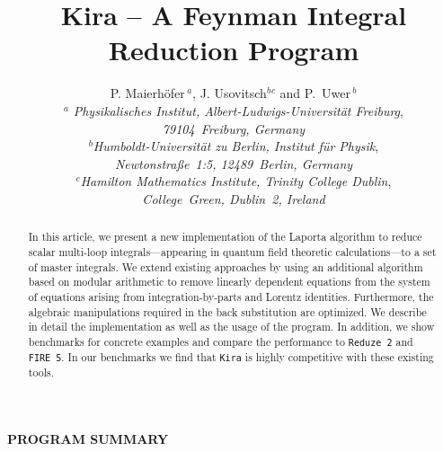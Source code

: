 \documentclass[a4paper,12pt]{scrartcl}
\title{\Large Kira -- A Feynman Integral Reduction Program}
\author{\large  P. Maierh\"ofer$\,^a$, J. Usovitsch${^b}{^c}$  and P.~Uwer$\,^b$ \\
  \large $^a$ \textit{Physikalisches Institut, Albert-Ludwigs-Universit\"at
    Freiburg},\\
  \large\textit{79104~Freiburg, Germany}\\
  \large $^b$\textit{Humboldt-Universit\"at zu Berlin, Institut f\"ur
    Physik},\\
  \large \textit{Newtonstra{\ss}e~1:5, 12489~Berlin, Germany}\\  
  \large $^c$\textit{Hamilton Mathematics Institute, Trinity College Dublin},\\
  \large \textit{College~Green, Dublin~2, Ireland}  
  }
\date{}
\newcommand*{\kira}{\texttt{Kira}}
\newcommand*{\firefive}{\texttt{FIRE\,5}}
\newcommand*{\reduzetwo}{\texttt{Reduze\,2}}
\begin{document}
\maketitle
\begin{abstract}
  In this article, we present a new implementation of the Laporta
  algorithm to reduce scalar multi-loop integrals---appearing in
  quantum field theoretic calcula\-tions---to a set of master
  integrals. We extend existing approaches by using an additional
  algorithm based on modular arithmetic to remove linearly dependent
  equations from the system of equations arising from
  integration-by-parts and Lorentz identities. Furthermore, the
  algebraic manipulations required in the back substitution are
  optimized. We describe in detail the implementation as well as the
  usage of the program. In addition, we show benchmarks for concrete
  examples and compare the performance to \reduzetwo{} and \firefive.
  In our benchmarks we find that \kira{} is highly competitive with these
  existing tools.
\end{abstract}

\newpage

\textbf{PROGRAM SUMMARY}

\vspace{1cm}
\end{document}

